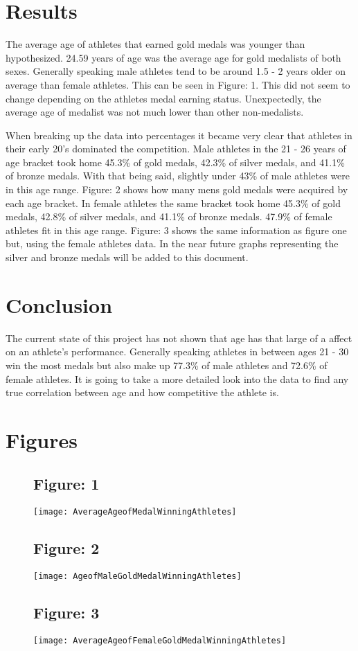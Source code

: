 \documentclass{article}
\begin{document}
\section{Results}
	The average age of athletes that earned gold medals was younger than hypothesized. 24.59 years of age was the average age for gold medalists of both sexes. Generally speaking male athletes tend to be around 1.5 - 2 years older on average than female athletes. This can be seen in Figure: 1. This did not seem to change depending on the athletes medal earning status. Unexpectedly, the average age of medalist was not much lower than other non-medalists.
\bigbreak
\par
\noindent
	When breaking up the data into percentages it became very clear that athletes in their early 20's dominated the competition. Male athletes in the 21 - 26 years of age  bracket took home 45.3\% of gold medals, 42.3\% of silver medals, and 41.1\% of bronze medals. With that being said, slightly under 43\% of male athletes were in this age range. Figure: 2 shows how many mens gold medals were acquired by each age bracket. In female athletes the same bracket took home 45.3\% of gold medals, 42.8\% of silver medals, and 41.1\% of bronze medals.  47.9\% of female athletes fit in this age range. Figure: 3 shows the same information as figure one but, using the female athletes data. In the near future graphs representing the silver and bronze medals will be added to this document.


\section{Conclusion}
	The current state of this project has not shown that age has that large of a affect on an athlete's performance. Generally speaking athletes in between ages 21 - 30 win the most medals but also make up 77.3\% of male athletes and 72.6\% of female athletes. It is going to take a more detailed look into the data to find any true correlation between age and how competitive the athlete is.

\newpage
\section{Figures}

\begin{figure}[ht!]
\centering
\subsection{Figure: 1}
\centering
\texttt{[image: AverageAgeofMedalWinningAthletes]}
\end{figure}

\begin{figure}[ht!]
\centering
\subsection{Figure: 2}
\centering
\texttt{[image: AgeofMaleGoldMedalWinningAthletes]}
\end{figure}

\begin{figure}[ht!]
\centering
\subsection{Figure: 3}
\centering
\texttt{[image: AverageAgeofFemaleGoldMedalWinningAthletes]}
\end{figure}
\end{document}
